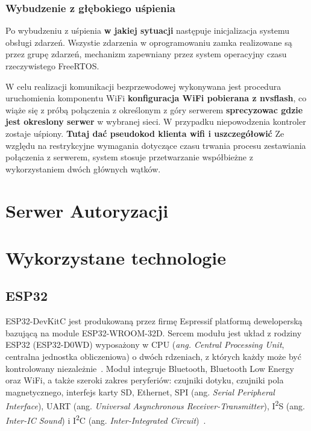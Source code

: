         \subsubsection{Wybudzenie z głębokiego uśpienia}

            Po wybudzeniu z uśpienia \textbf{w jakiej sytuacji} następuje inicjalizacja systemu obsługi zdarzeń. Wszystie zdarzenia w oprogramowaniu zamka realizowane są przez grupę zdarzeń, mechanizm zapewniany przez system operacyjny czasu rzeczywistego FreeRTOS.

            W celu realizacji komunikacji bezprzewodowej wykonywana jest procedura uruchomienia komponentu WiFi \textbf{konfiguracja WiFi pobierana z nvsflash}, co wiąże się z próbą połączenia z określonym z góry serwerem \textbf{sprecyzowac gdzie jest okreslony serwer} w wybranej sieci. W przypadku niepowodzenia kontroler zostaje uśpiony. \textbf{Tutaj dać pseudokod klienta wifi i uszczegółowić}
            Ze względu na restrykcyjne wymagania dotyczące czasu trwania procesu zestawiania połączenia z serwerem, system stosuje przetwarzanie współbieżne z wykorzystaniem dwóch głównych wątków.

\section{Serwer Autoryzacji}

\section {Wykorzystane technologie}

    \subsection{ESP32}
        ESP32-DevKitC jest produkowaną przez firmę Espressif platformą deweloperską bazującą na module ESP32-WROOM-32D. Sercem modułu jest układ z rodziny ESP32 (ESP32-D0WD) wyposażony w CPU (\textit{ang. Central Processing Unit}, centralna jednostka obliczeniowa) o dwóch rdzeniach, z których każdy może być kontrolowany niezależnie~\cite{esp32-wroom32-ds}. Moduł integruje Bluetooth, Bluetooth Low Energy oraz WiFi, a także szeroki zakres peryferiów: czujniki dotyku, czujniki pola magnetycznego, interfejs karty SD, Ethernet, SPI (ang. \textit{Serial Peripheral Interface}), UART (ang. \textit{Universal Asynchronous Receiver-Transmitter}), I\textsuperscript{2}S (ang. \textit{Inter-IC Sound}) i I\textsuperscript{2}C (ang. \textit{Inter-Integrated Circuit})~\cite{esp32-wroom32-ds}.


